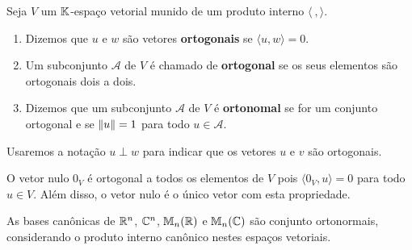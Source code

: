 \begin{definicao}
	Seja $V$ um $\mathbb{K}$-espa\c{c}o vetorial munido de um produto interno $\langle\ , \rangle$.
	\begin{enumerate}
		\item Dizemos que $u$ e $w$ s\~ao vetores \textbf{ortogonais} se $\langle u, w \rangle = 0$.
		\item Um subconjunto $\mathcal{A}$ de $V$ \'e chamado de \textbf{ortogonal} se os seus elementos s\~ao ortogonais dois a dois.
		\item Dizemos que um subconjunto $\mathcal{A}$ de $V$ \'e \textbf{ortonomal} se for um conjunto ortogonal e se $\left\lVert u\right\rVert = 1$ para todo $u \in \mathcal{A}$.
	\end{enumerate}
\end{definicao}

\begin{notacao}
	Usaremos a nota\c{c}\~ao $u \perp w$ para indicar que os vetores $u$ e $v$ s\~ao ortogonais.
\end{notacao}

\begin{observacao}
	O vetor nulo $0_V$ \'e ortogonal a todos os elementos de $V$ pois $\langle 0_V, u \rangle = 0$ para todo $u \in V$. Al\'em disso, o vetor nulo \'e o \'unico vetor com esta propriedade.
\end{observacao}

\begin{exemplo}
	As bases can\^onicas de $\mathbb{R}^n$, $\mathbb{C}^n$, $\mathbb{M}_n(\mathbb{R})$ e $\mathbb{M}_n(\mathbb{C})$ s\~ao conjunto ortonormais, considerando o produto interno can\^onico nestes espa\c{c}os vetoriais.
\end{exemplo}

